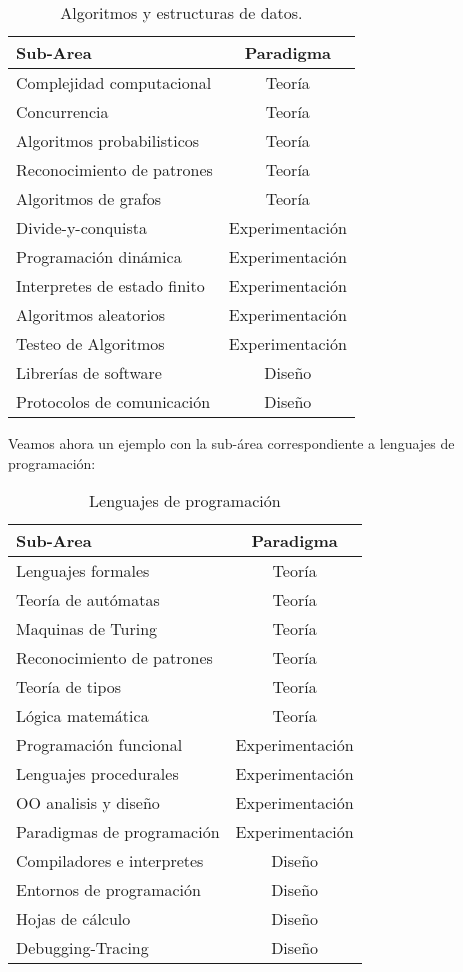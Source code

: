\begin{table}[h]
\centering
\caption{Algoritmos y estructuras de datos.}
\begin{tabular}[t]{lc}
\hline
Sub-Area&Paradigma\\
\hline
Complejidad computacional& Teoría\\
Concurrencia& Teoría\\
Algoritmos probabilisticos& Teoría\\
Reconocimiento de patrones& Teoría\\
Algoritmos de grafos& Teoría\\
Divide-y-conquista&Experimentación\\
Programación dinámica&Experimentación\\
Interpretes de estado finito&Experimentación\\
Algoritmos aleatorios&Experimentación\\
Testeo de Algoritmos&Experimentación\\
Librerías de software&Diseño\\
Protocolos de comunicación&Diseño\\

\hline
\end{tabular}
\end{table}

Veamos ahora un ejemplo con la sub-área correspondiente a lenguajes de programación:


\begin{table}[h]
\centering
\caption{Lenguajes de programación}
\begin{tabular}[t]{lc}
\hline
Sub-Area&Paradigma\\
\hline
Lenguajes formales& Teoría\\
Teoría de autómatas& Teoría\\
Maquinas de Turing& Teoría\\
Reconocimiento de patrones& Teoría\\
Teoría de tipos& Teoría\\
Lógica matemática& Teoría\\
Programación funcional&Experimentación\\
Lenguajes procedurales&Experimentación\\
OO analisis y diseño&Experimentación\\
Paradigmas de programación&Experimentación\\
Compiladores e interpretes&Diseño\\
Entornos de programación&Diseño\\
Hojas de cálculo&Diseño\\
Debugging-Tracing&Diseño\\
\hline
\end{tabular}
\end{table}

